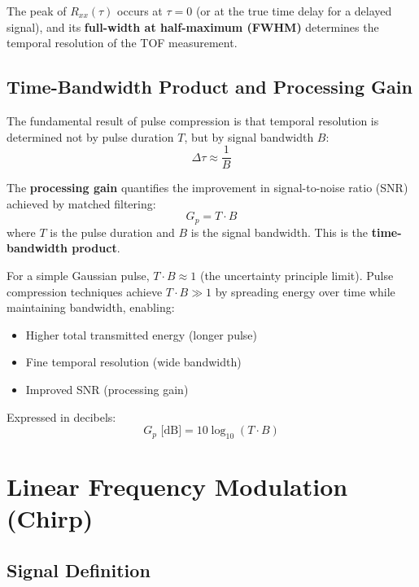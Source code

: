 \documentclass[11pt]{article}
\begin{document}
The peak of $R_{xx}(\tau)$ occurs at $\tau = 0$ (or at the true time delay for a delayed signal), and its \textbf{full-width at half-maximum (FWHM)} determines the temporal resolution of the TOF measurement.

\subsection{Time-Bandwidth Product and Processing Gain}

The fundamental result of pulse compression is that temporal resolution is determined not by pulse duration $T$, but by signal bandwidth $B$:
\begin{equation}
\Delta \tau \approx \frac{1}{B}
\end{equation}

The \textbf{processing gain} quantifies the improvement in signal-to-noise ratio (SNR) achieved by matched filtering:
\begin{equation}
G_p = T \cdot B
\end{equation}
where $T$ is the pulse duration and $B$ is the signal bandwidth. This is the \textbf{time-bandwidth product}.

For a simple Gaussian pulse, $T \cdot B \approx 1$ (the uncertainty principle limit). Pulse compression techniques achieve $T \cdot B \gg 1$ by spreading energy over time while maintaining bandwidth, enabling:
\begin{itemize}
    \item Higher total transmitted energy (longer pulse)
    \item Fine temporal resolution (wide bandwidth)
    \item Improved SNR (processing gain)
\end{itemize}

Expressed in decibels:
\begin{equation}
G_p \text{ [dB]} = 10 \log_{10}(T \cdot B)
\end{equation}

\section{Linear Frequency Modulation (Chirp)}

\subsection{Signal Definition}
\end{document}
